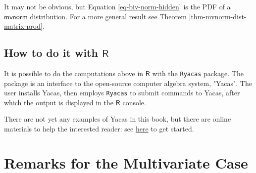 \begin{rem}
It may not be obvious, but Equation \eqref{eq-biv-norm-hidden} is the PDF of a
\(\mathsf{mvnorm}\) distribution. For a more general result see
Theorem \ref{thm-mvnorm-dist-matrix-prod}.
\end{rem}

\subsection{How to do it with \(\mathsf{R}\)}
\label{sec-7-7-1}

It is possible to do the computations above in \(\mathsf{R}\) with the
\texttt{Ryacas} package. The package is an interface to the open-source
computer algebra system, "Yacas". The user installs Yacas, then
employs \texttt{Ryacas} to submit commands to Yacas, after which the output
is displayed in the \(\mathsf{R}\) console.

There are not yet any examples of Yacas in this book, but there are
online materials to help the interested reader: see \href{http://code.google.com/p/ryacas/}{here} to get
started.

\section{Remarks for the Multivariate Case}
\label{sec-7-8}


